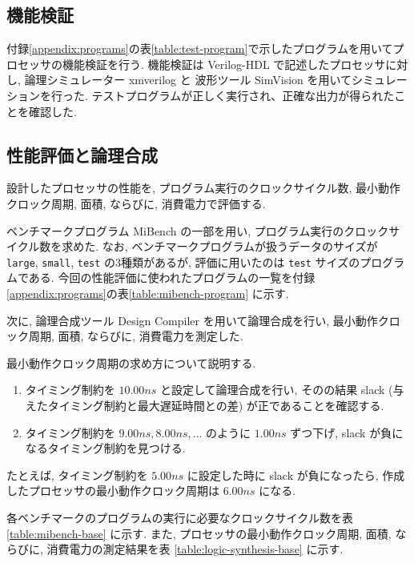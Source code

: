 \documentclass[../main.tex]{subfiles}
\begin{document}
  \subsection{機能検証}
  付録\ref{appendix:programs}の表\ref{table:test-program}で示したプログラムを用いてプロセッサの機能検証を行う.
  機能検証は Verilog-HDL で記述したプロセッサに対し, 
  論理シミュレーター xmverilog と
  波形ツール SimVision を用いてシミュレーションを行った.
  テストプログラムが正しく実行され、正確な出力が得られたことを確認した.

  \subsection{性能評価と論理合成}
  設計したプロセッサの性能を, プログラム実行のクロックサイクル数, 
  最小動作クロック周期, 面積, ならびに, 消費電力で評価する.

  ベンチマークプログラム MiBench \cite{mibench} の一部を用い, プログラム実行のクロックサイクル数を求めた.
  なお, ベンチマークプログラムが扱うデータのサイズが \verb|large|, \verb|small|, \verb|test| の3種類があるが, 
  評価に用いたのは \verb|test| サイズのプログラムである.
  今回の性能評価に使われたプログラムの一覧を付録\ref{appendix:programs}の表\ref{table:mibench-program} に示す.

  次に, 論理合成ツール Design Compiler を用いて論理合成を行い, 
  最小動作クロック周期, 面積, ならびに, 消費電力を測定した.

  最小動作クロック周期の求め方について説明する.
  \begin{enumerate}
    \item タイミング制約を $10.00\unit{ns}$ と設定して論理合成を行い, 
    そのの結果 slack (与えたタイミング制約と最大遅延時間との差) が正であることを確認する.
    \item タイミング制約を $9.00\unit{ns}, 8.00\unit{ns}, \ldots$ のように $1.00\unit{ns}$ ずつ下げ, 
    slack が負になるタイミング制約を見つける.
  \end{enumerate}

  たとえば, タイミング制約を $5.00\unit{ns}$ に設定した時に slack が負になったら, 
  作成したプロセッサの最小動作クロック周期は $6.00\unit{ns}$ になる.

  各ベンチマークのプログラムの実行に必要なクロックサイクル数を表 \ref{table:mibench-base} に示す.
  また, プロセッサの最小動作クロック周期, 面積, ならびに, 消費電力の測定結果を表 \ref{table:logic-synthesis-base} に示す.
\end{document}

